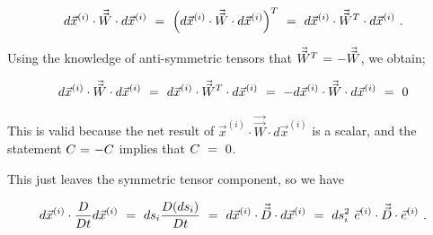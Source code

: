 \documentclass{article}
\begin{document}
\begin{equation} \label{eb-eq-1-115}
d \vec{x}^{(i)} \cdot \vec{\vec{W}} \cdot d \vec{x}^{(i)} \hspace{0.125cm} = \hspace{0.125cm} \Big( d \vec{x}^{(i)} \cdot \vec{\vec{W}} \cdot d \vec{x}^{(i)} \Big)^T \hspace{0.125cm} = \hspace{0.125cm} d \vec{x}^{(i)} \cdot \vec{\vec{W}}^T \cdot d \vec{x}^{(i)} \hspace{0.125cm} . 
\end{equation} 

Using the knowledge of anti-symmetric tensors that \begin{math} \vec{\vec{W}}^T \hspace{0.025cm} = \hspace{0.025cm} - \vec{\vec{W}} \end{math}, we obtain;

\begin{equation} \label{eb-eq-1-116}
d \vec{x}^{(i)} \cdot \vec{\vec{W}} \cdot d \vec{x}^{(i)} \hspace{0.125cm} = \hspace{0.125cm} d \vec{x}^{(i)} \cdot \vec{\vec{W}}^T \cdot d \vec{x}^{(i)} \hspace{0.125cm} = \hspace{0.125cm} - d \vec{x}^{(i)} \cdot \vec{\vec{W}} \cdot d \vec{x}^{(i)} \hspace{0.125cm} = \hspace{0.125cm} 0
\end{equation} 

This is valid because the net result of \begin{math} \vec{x}^{(i)} \cdot \vec{\vec{W}} \cdot d \vec{x}^{(i)} \end{math} is a scalar, and the statement \begin{math} C \hspace{0.025cm} = \hspace{0.025cm} - C \end{math} implies that \begin{math} C \hspace{0.125cm} = \hspace{0.125cm} 0 \end{math}. 

This just leaves the symmetric tensor component, so we have 

\begin{equation} \label{eb-eq-1-117}
d \vec{x}^{(i)} \cdot \frac{D}{D t} d \vec{x}^{(i)} \hspace{0.125cm} = \hspace{0.125cm} ds_i \frac{D ( ds_i )}{D t} \hspace{0.125cm} = \hspace{0.125cm} d \vec{x}^{(i)} \cdot  \vec{\vec{D}} \cdot d \vec{x}^{(i)}  \hspace{0.125cm} = \hspace{0.125cm} ds_{i}^{2} \hspace{0.125cm} \vec{e}^{(i)} \cdot  \vec{\vec{D}} \cdot \vec{e}^{(i)} \hspace{0.125cm} . 
\end{equation} 
\end{document}

